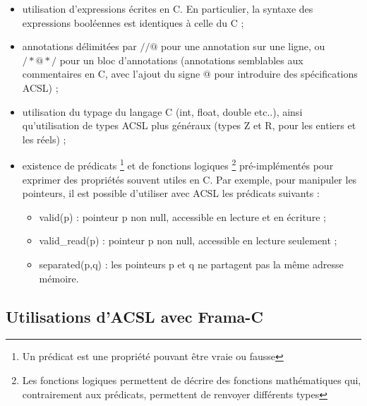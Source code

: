 \begin{itemize}
	\item utilisation d'expressions écrites en C. En particulier, la syntaxe des expressions booléennes est identiques à celle du C ;
	\item annotations délimitées par $ //@ $ pour une annotation sur une ligne, ou $ /*@  */ $ pour un bloc d'annotations (annotations semblables aux commentaires en C, avec l'ajout du signe @ pour introduire des spécifications ACSL) ;
	\item utilisation du typage du langage C (int, float, double etc..), ainsi qu'utilisation de types ACSL plus généraux (types Z et R, pour les entiers et les réels) ;
	\item existence de prédicats \footnote{Un prédicat est une propriété pouvant être vraie ou fausse} et de fonctions logiques \footnote{Les fonctions logiques permettent de décrire des fonctions mathématiques qui, contrairement aux prédicats, permettent de renvoyer différents types} pré-implémentés pour exprimer des propriétés souvent utiles en C. Par exemple, pour manipuler les pointeurs, il est possible d'utiliser avec ACSL les prédicats suivants :
	\begin{itemize}
		\item \SLASH valid(p) : pointeur p non null, accessible en lecture et en écriture ;
		\item \SLASH valid\_read(p) : pointeur p non null, accessible en lecture seulement ;
		\item \SLASH separated(p,q) : les pointeurs p et q ne partagent pas la même adresse mémoire.
	\end{itemize}
\end{itemize}

\subsection{Utilisations d'ACSL avec Frama-C}

